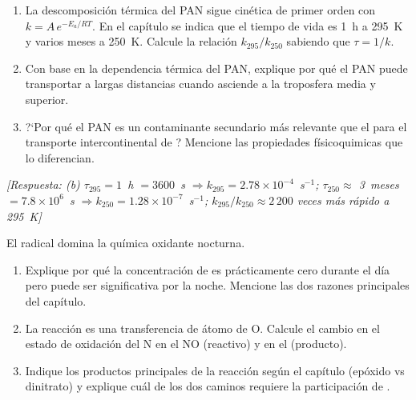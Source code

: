 \begin{bloque_ejercicios}
\begin{ejercicios}
\begin{enumerate}[label=\alph*)]
    \item La descomposici\'on t\'ermica del PAN sigue
          cin\'etica de primer orden con $k = A\,e^{-E_a/RT}$.
          En el cap\'itulo se indica que el tiempo de vida es
          1~h a \SI{295}{\kelvin} y varios meses a \SI{250}{\kelvin}.
          Calcule la relaci\'on $k_{295}/k_{250}$ sabiendo que
          $\tau = 1/k$.

    \item Con base en la dependencia t\'ermica del PAN,
          explique por qu\'e el PAN puede transportar
           a largas distancias cuando asciende
          a la troposfera media y superior.

    \item ?`Por qu\'e el PAN es un contaminante secundario
          m\'as relevante que el  para el transporte
          intercontinental de ? Mencione las propiedades
          f\'isicoquimicas que lo diferencian.
\end{enumerate}

\textit{[Respuesta:
(b) $\tau_{295} = 1$~h $= 3600$~s $\Rightarrow k_{295}
    = 2.78\times10^{-4}$~s$^{-1}$;
    $\tau_{250} \approx$ 3~meses $= 7.8\times10^6$~s
    $\Rightarrow k_{250} = 1.28\times10^{-7}$~s$^{-1}$;
    $k_{295}/k_{250} \approx 2\,200$ veces m\'as r\'apido a 295~K]}

\item El radical  domina la qu\'imica oxidante nocturna.

\begin{enumerate}[label=\alph*)]
    \item Explique por qu\'e la concentraci\'on de  es
          pr\'acticamente cero durante el d\'ia pero puede ser
          significativa por la noche. Mencione las dos razones
          principales del cap\'itulo.

    \item La reacci\'on  es una
          transferencia de \'atomo de O. Calcule el cambio en
          el estado de oxidaci\'on del N en el NO (reactivo)
          y en el  (producto).

    \item Indique los productos principales de la reacci\'on
           seg\'un el cap\'itulo (ep\'oxido vs
          dinitrato) y explique cu\'al de los dos caminos
          requiere la participaci\'on de .


\end{enumerate}
\end{ejercicios}
\end{bloque_ejercicios}
